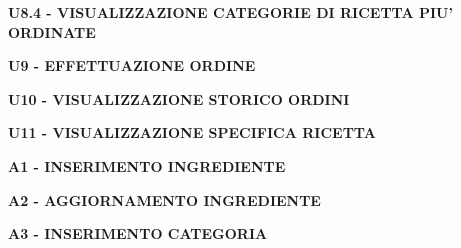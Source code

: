 \textbf{U8.4 - VISUALIZZAZIONE CATEGORIE DI RICETTA PIU' ORDINATE}



\vspace{2em}

\textbf{U9 - EFFETTUAZIONE ORDINE}



\vspace{2em}

\textbf{U10 - VISUALIZZAZIONE STORICO ORDINI}



\vspace{2em}

\textbf{U11 - VISUALIZZAZIONE SPECIFICA RICETTA}



\vspace{2em}

\textbf{A1 - INSERIMENTO INGREDIENTE}



\vspace{2em}

\textbf{A2 - AGGIORNAMENTO INGREDIENTE}



\vspace{2em}

\textbf{A3 - INSERIMENTO CATEGORIA}



\vspace{2em}

